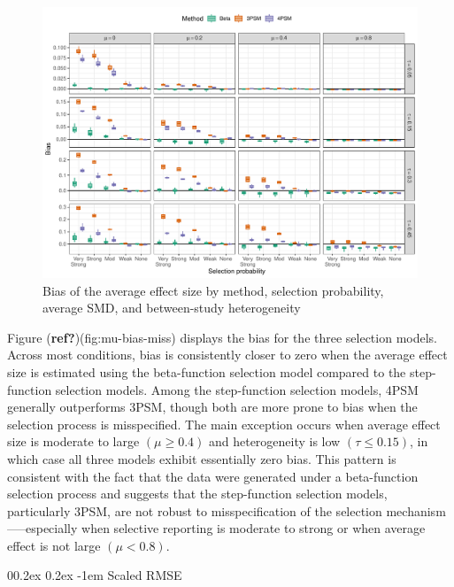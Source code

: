 \documentclass[
  american,
  man, donotrepeattitle,floatsintext]{apa7}
\makeatletter
\let\oldparagraph\paragraph
\renewcommand{\paragraph}{
    \@ifstar
      \xxxParagraphStar
      \xxxParagraphNoStar
  }
\newcommand{\xxxParagraphStar}[1]{\oldparagraph*{#1}\mbox{}}
\newcommand{\xxxParagraphNoStar}[1]{\oldparagraph{#1}\mbox{}}
\renewcommand{\paragraph}{\@startsection{paragraph}{4}{\parindent}%
  {0\baselineskip \@plus 0.2ex \@minus 0.2ex}%
  {-1em}%
  {\normalfont\normalsize\bfseries\itshape\typesectitle}}
\makeatother
\begin{document}
\begin{figure}
\includegraphics{beta-function-selection-models-with-dependent-effects_files/figure-latex/mu-bias-miss-1} \caption{Bias of the average effect size by method, selection probability, average SMD, and between-study heterogeneity}\label{fig:mu-bias-miss}
\end{figure}

Figure (\textbf{ref?})(fig:mu-bias-miss) displays the bias for the three selection models. Across most conditions, bias is consistently closer to zero when the average effect size is estimated using the beta-function selection model compared to the step-function selection models. Among the step-function selection models, 4PSM generally outperforms 3PSM, though both are more prone to bias when the selection process is misspecified. The main exception occurs when average effect size is moderate to large \((\mu \geq 0.4)\) and heterogeneity is low \((\tau \leq 0.15)\), in which case all three models exhibit essentially zero bias. This pattern is consistent with the fact that the data were generated under a beta-function selection process and suggests that the step-function selection models, particularly 3PSM, are not robust to misspecification of the selection mechanism-----especially when selective reporting is moderate to strong or when average effect is not large \((\mu < 0.8)\).

\paragraph{Scaled RMSE}\label{scaled-rmse-1}
\end{document}
